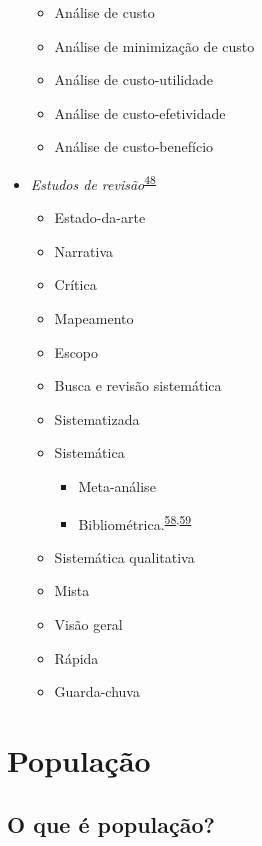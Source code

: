 \documentclass[
]{book}
\begin{document}
\begin{itemize}
  \begin{itemize}
  \item
    Análise de custo
  \item
    Análise de minimização de custo
  \item
    Análise de custo-utilidade
  \item
    Análise de custo-efetividade
  \item
    Análise de custo-benefício
  \end{itemize}
\item
  \emph{Estudos de revisão}\textsuperscript{\protect\hyperlink{ref-Grant2009}{48}}

  \begin{itemize}
  \item
    Estado-da-arte
  \item
    Narrativa
  \item
    Crítica
  \item
    Mapeamento
  \item
    Escopo
  \item
    Busca e revisão sistemática
  \item
    Sistematizada
  \item
    Sistemática

    \begin{itemize}
    \item
      Meta-análise
    \item
      Bibliométrica.\textsuperscript{\protect\hyperlink{ref-donthu2021}{58},\protect\hyperlink{ref-lim2023}{59}}
    \end{itemize}
  \item
    Sistemática qualitativa
  \item
    Mista
  \item
    Visão geral
  \item
    Rápida
  \item
    Guarda-chuva
  \end{itemize}
\end{itemize}

\hypertarget{populacao}{%
\section{População}\label{populacao}}

\hypertarget{o-que-uxe9-populauxe7uxe3o}{%
\subsection{O que é população?}\label{o-que-uxe9-populauxe7uxe3o}}
\end{document}
